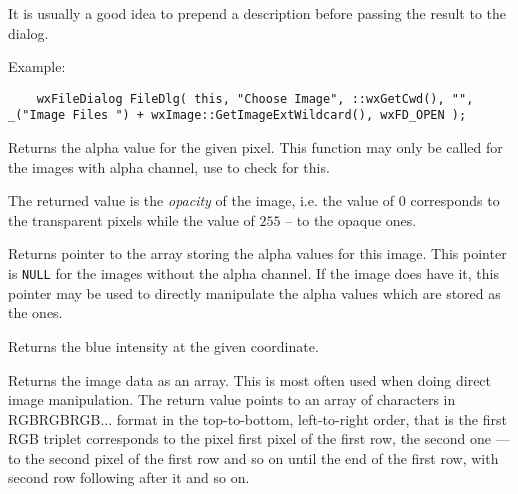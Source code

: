 It is usually a good idea to prepend a description before passing the result to the dialog.

Example:

\begin{verbatim}
    wxFileDialog FileDlg( this, "Choose Image", ::wxGetCwd(), "", _("Image Files ") + wxImage::GetImageExtWildcard(), wxFD_OPEN );
\end{verbatim}




\label{wximagegetalpha}


Returns the alpha value for the given pixel. This function may only be called
for the images with alpha channel, use  to
check for this.

The returned value is the {\it opacity} of the image, i.e. the value of $0$
corresponds to the transparent pixels while the value of $255$ -- to the opaque
ones.


Returns pointer to the array storing the alpha values for this image. This
pointer is {\tt NULL} for the images without the alpha channel. If the image
does have it, this pointer may be used to directly manipulate the alpha values
which are stored as the  ones.


\label{wximagegetblue}


Returns the blue intensity at the given coordinate.


\label{wximagegetdata}


Returns the image data as an array. This is most often used when doing
direct image manipulation. The return value points to an array of
characters in RGBRGBRGB$\ldots$ format in the top-to-bottom, left-to-right
order, that is the first RGB triplet corresponds to the pixel first pixel of
the first row, the second one --- to the second pixel of the first row and so
on until the end of the first row, with second row following after it and so
on.

